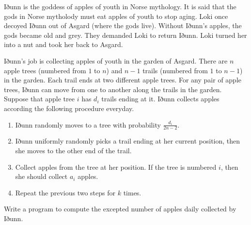 Iðunn is the goddess of apples of youth in Norse mythology. 
It is said that the gods in Norse mytholody must eat apples of youth to 
stop aging. 
Loki once decoyed Iðunn out of Asgard (where the gods live). 
Without Iðunn's 
apples, the gods became old and grey. They demanded Loki to return Iðunn. 
Loki turned her into a nut and took her back to Asgard. 

Iðunn's job is collecting apples of youth in the garden of Asgard. 
There are $n$ apple trees (numbered from $1$ to $n$) and $n-1$ trails 
(numbered from $1$ to $n-1$) in the garden. 
Each trail ends at two different apple trees. 
For any pair of apple trees, Iðunn can move from one to another along 
the trails in the garden.
Suppose that apple 
tree $i$ has $d_i$ trails ending at it. Iðunn collects apples according the 
following procedure everyday.
\begin{enumerate}
\tightlist
\item Iðunn randomly moves to a tree with probability $\frac{d_i}{2n-2}$.
\item Iðunn uniformly randomly picks a trail ending at her current position, 
then she moves to the other end of the trail.
\item Collect apples from the tree at her position. 
If the tree is numbered $i$, then she should collect $a_i$ apples.
\item Repeat the previous two steps for $k$ times.
\end{enumerate}

Write a program to compute the excepted number of apples daily collected by 
Iðunn.

